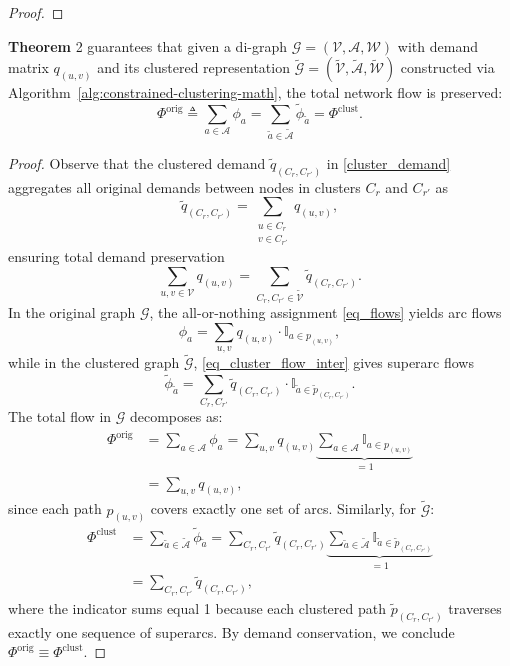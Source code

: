 \documentclass[lettersize,journal]{IEEEtran}
\begin{document}
\begin{proof}
\end{proof}

\textbf{Theorem} 2 guarantees  that given a di-graph $\mathcal{G} = (\mathcal{V}, \mathcal{A}, \mathcal{W})$ with demand matrix $q_{(u,v)}$ and its clustered representation $\tilde{\mathcal{G}} = (\tilde{\mathcal{V}}, \tilde{\mathcal{A}}, \tilde{\mathcal{W}})$ constructed via Algorithm~\ref{alg:constrained-clustering-math}, the total network flow is preserved:
\[
\Phi^{\text{orig}} \triangleq \sum_{a \in \mathcal{A}} \phi_a
= \sum_{\tilde{a} \in \tilde{\mathcal{A}}} \tilde{\phi}_{\tilde{a}}
= \Phi^{\text{clust}}.
\]

\begin{proof}
Observe that the clustered demand $\tilde{q}_{(C_{r},C_{r'})}$ in \eqref{cluster_demand} aggregates all original demands between nodes in clusters $C_{r}$ and $C_{r'}$ as
\[
\tilde{q}_{(C_{r},C_{r'})}
=
\sum_{\substack{u \in C_{r} \\ v \in C_{r'}}} q_{(u,v)},
\]
ensuring total demand preservation
\[
\sum_{u,v \in \mathcal{V}} q_{(u,v)}
=
\sum_{C_{r},C_{r'} \in \tilde{\mathcal{V}}} \tilde{q}_{(C_{r},C_{r'})}.
\]
In the original graph $\mathcal{G}$, the all-or-nothing assignment \eqref{eq_flows} yields arc flows
\[
\phi_a = \sum_{u,v} q_{(u,v)} \cdot \mathbb{I}_{a \in p_{(u,v)}},
\]
while in the clustered graph $\tilde{\mathcal{G}}$, \eqref{eq_cluster_flow_inter} gives superarc flows
\[
\tilde{\phi}_{\tilde{a}}
=
\sum_{C_{r},C_{r'}} \tilde{q}_{(C_{r},C_{r'})} \cdot
\mathbb{I}_{\tilde{a} \in \tilde{p}_{(C_{r},C_{r'})}}.
\]
The total flow in $\mathcal{G}$ decomposes as:
\begin{align}
\Phi^{\text{orig}}
&= \sum_{a \in \mathcal{A}} \phi_a
= \sum_{u,v} q_{(u,v)} \underbrace{\sum_{a \in \mathcal{A}} \mathbb{I}_{a \in p_{(u,v)}}}_{=1} \\
&= \sum_{u,v} q_{(u,v)},
\end{align}
since each path $p_{(u,v)}$ covers exactly one set of arcs. Similarly, for $\tilde{\mathcal{G}}$:
\begin{align}
\Phi^{\text{clust}}
&= \sum_{\tilde{a} \in \tilde{\mathcal{A}}} \tilde{\phi}_{\tilde{a}}
= \sum_{C_{r},C_{r'}} \tilde{q}_{(C_{r},C_{r'})}
   \underbrace{\sum_{\tilde{a} \in \tilde{\mathcal{A}}}
               \mathbb{I}_{\tilde{a} \in \tilde{p}_{(C_{r},C_{r'})}}}_{=1} \\
&= \sum_{C_{r},C_{r'}} \tilde{q}_{(C_{r},C_{r'})},
\end{align}
where the indicator sums equal 1 because each clustered path
$\tilde{p}_{(C_{r},C_{r'})}$ traverses exactly one sequence of superarcs.
By demand conservation, we conclude
$\Phi^{\text{orig}} \equiv \Phi^{\text{clust}}$.
\end{proof}





\end{document}
